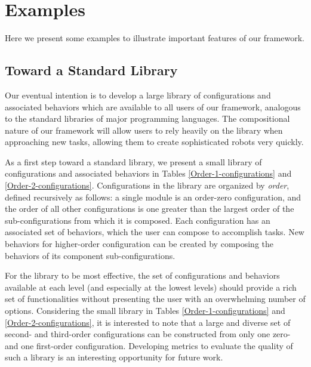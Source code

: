 \documentclass[conference]{IEEEtran}
\theoremstyle{definition}
\begin{document}
\section{Examples}
Here we present some examples to illustrate important features of our framework.
\subsection{Toward a Standard Library}
Our eventual intention is to develop a large library of configurations and associated
behaviors which are available to all users of our framework, analogous to the standard
libraries of major programming languages.  The compositional nature of our framework
will allow users to rely heavily on the library when approaching new tasks, allowing
them to create sophisticated robots very quickly.

As a first step toward a standard library, we present a small library of configurations
and associated behaviors in Tables \ref{Order-1-configurations} and \ref{Order-2-configurations}.
Configurations in the library are organized by \textit{order}, defined recursively
as follows: a single module is an order-zero configuration, and the order of all
other configurations is one greater than the largest order of the sub-configurations
from which it is composed. Each configuration has an associated set of behaviors,
which the user can compose to accomplish tasks.  New behaviors for higher-order configuration can be created by composing the behaviors of its component sub-configurations.

For the library to be most effective, the set of configurations and behaviors available
 at each level (and especially at the lowest levels) should provide a rich set of
 functionalities without presenting the user with an overwhelming number of options. 
 Considering the small library in Tables \ref{Order-1-configurations} and \ref{Order-2-configurations},
 it is interested to note that a large  and diverse set of second- and third-order configurations can
be constructed from only one zero- and one first-order configuration. Developing metrics to
evaluate the quality of such a library is an interesting opportunity for future work. 
\end{document}
